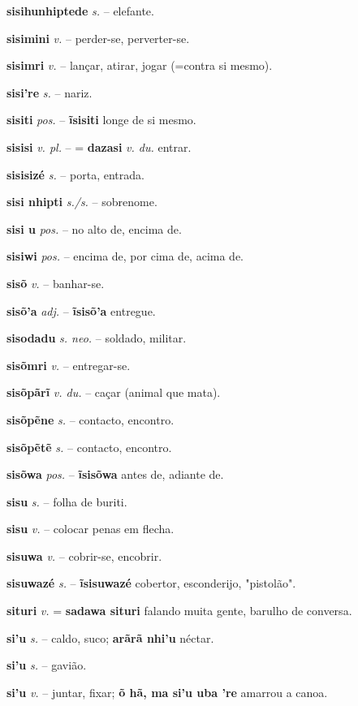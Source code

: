 \textbf{sisihunhiptede} \textit{s.} -- elefante.

\textbf{sisimini} \textit{v.} -- perder-se, perverter-se.

\textbf{sisimri} \textit{v.} -- lançar, atirar, jogar (=contra si mesmo).

\textbf{sisi're} \textit{s.} -- nariz.

\textbf{sisiti} \textit{pos.} -- \textbf{ĩsisiti} longe de si mesmo.

\textbf{sisisi} \textit{v. pl.} -- = \textbf{dazasi} \textit{v. du.} entrar.

\textbf{sisisizé} \textit{s.} -- porta, entrada.

\textbf{sisi nhipti} \textit{s./s.} -- sobrenome.

\textbf{sisi u} \textit{pos.} -- no alto de, encima de.

\textbf{sisiwi} \textit{pos.} -- encima de, por cima de, acima de.

\textbf{sisõ} \textit{v.} -- banhar-se.

\textbf{sisõ'a} \textit{adj.} -- \textbf{ĩsisõ'a} entregue.

\textbf{sisodadu} \textit{s. neo.} -- soldado, militar.

\textbf{sisõmri} \textit{v.} -- entregar-se.

\textbf{sisõpãrĩ} \textit{v. du.} -- caçar (animal que mata).

\textbf{sisõpẽne} \textit{s.} -- contacto, encontro.

\textbf{sisõpẽtẽ} \textit{s.} -- contacto, encontro.

\textbf{sisõwa} \textit{pos.} -- \textbf{ĩsisõwa} antes de, adiante de.

\textbf{sisu} \textit{s.} -- folha de buriti.

\textbf{sisu} \textit{v.} -- colocar penas em flecha.

\textbf{sisuwa} \textit{v.} -- cobrir-se, encobrir.

\textbf{sisuwazé} \textit{s.} -- \textbf{ĩsisuwazé} cobertor, esconderijo, "pistolão".

\textbf{situri} \textit{v.} = \textbf{sadawa situri} falando muita gente, barulho de conversa.

\textbf{si'u} \textit{s.} -- caldo, suco; \textbf{arãrã nhi'u} néctar.

\textbf{si'u} \textit{s.} -- gavião.

\textbf{si'u} \textit{v.} -- juntar, fixar; \textbf{õ hã, ma si'u uba 're} amarrou a canoa.

